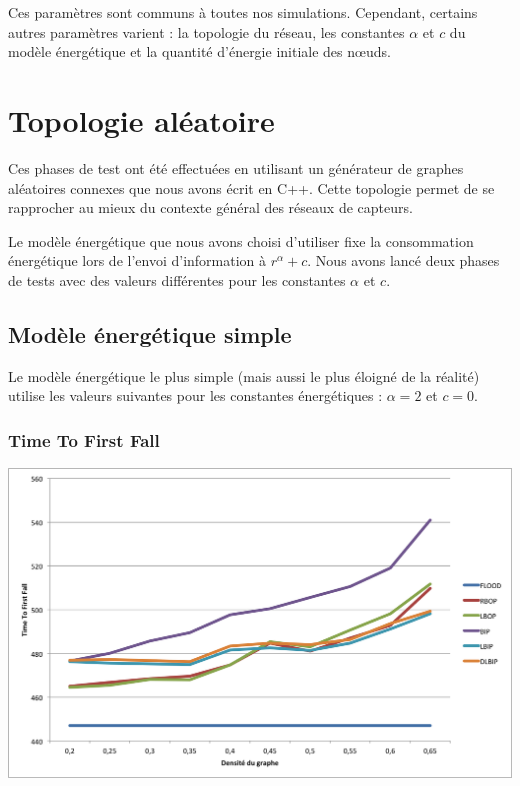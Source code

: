 Ces paramètres sont communs à toutes nos simulations. Cependant, certains autres paramètres varient : la topologie du réseau, les constantes $\alpha$ et $c$ du modèle énergétique et la quantité d'énergie initiale des nœuds.


\section{Topologie aléatoire}
Ces phases de test ont été effectuées en utilisant un générateur de graphes aléatoires connexes que nous avons écrit en C++. Cette topologie permet de se rapprocher au mieux du contexte général des réseaux de capteurs.

Le modèle énergétique que nous avons choisi d'utiliser fixe la consommation énergétique lors de l'envoi d'information à $ r^\alpha + c $. Nous avons lancé deux phases de tests avec des valeurs différentes pour les constantes $\alpha$ et $c$.

\subsection{Modèle énergétique simple}
Le modèle énergétique le plus simple (mais aussi le plus éloigné de la réalité) utilise les valeurs suivantes pour les constantes énergétiques : $\alpha = 2$ et $c = 0$.

\subsubsection{Time To First Fall}
\begin{bigcenter}
\includegraphics[scale=0.89]{Simus/ttff_2_0}
\end{bigcenter}


